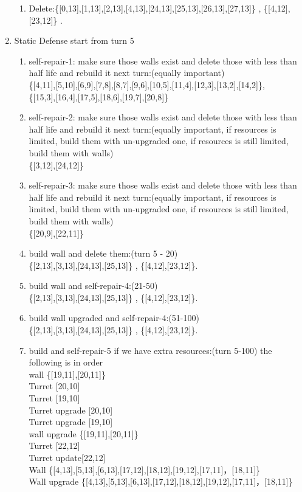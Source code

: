 \documentclass[12pt]{article}
\begin{document}
\begin{enumerate}
\begin{enumerate}
\item Delete:\{[0,13],[1,13],[2,13],[4,13],[24,13],[25,13],[26,13],[27,13]\} , \{[4,12],[23,12]\} .
\end{enumerate}
     \item Static Defense start from turn 5
\begin{enumerate}
\item self-repair-1: make sure those walls exist and delete those with less than half life and rebuild it next turn:(equally important)\\ \{[4,11],[5,10],[6,9],[7,8],[8,7],[9,6],[10,5],[11,4],[12,3],[13,2],[14,2]\},\\\{[15,3],[16,4],[17,5],[18,6],[19,7],[20,8]\}
\item self-repair-2: make sure those walls exist and delete those with less than half life and rebuild it next turn:(equally important, if resources is limited, build them with un-upgraded one, if resources is still limited, build them with walls)\\ \{[3,12],[24,12]\}
\item self-repair-3: make sure those walls exist and delete those with less than half life and rebuild it next turn:(equally important, if resources is limited, build them with un-upgraded one, if resources is still limited, build them with walls)\\ \{[20,9],[22,11]\}
\item build wall and delete them:(turn 5 - 20)\\ \{[2,13],[3,13],[24,13],[25,13]\} , \{[4,12],[23,12]\}.
\item build wall and self-repair-4:(21-50)\\ \{[2,13],[3,13],[24,13],[25,13]\} , \{[4,12],[23,12]\}.
\item build wall upgraded and self-repair-4:(51-100)\\ \{[2,13],[3,13],[24,13],[25,13]\} , \{[4,12],[23,12]\}.
\item build and self-repair-5 if we have extra resources:(turn 5-100) the following is in order\\ wall \{[19,11],[20,11]\}\\ Turret [20,10] \\ Turret [19,10] \\ Turret upgrade [20,10] \\ Turret upgrade [19,10] \\ wall upgrade \{[19,11],[20,11]\}\\ Turret [22,12]\\ Turret update[22,12]\\ Wall \{[4,13],[5,13],[6,13],[17,12],[18,12],[19,12],[17,11]，[18,11]\}\\ Wall upgrade \{[4,13],[5,13],[6,13],[17,12],[18,12],[19,12],[17,11]，[18,11]\}\

\end{enumerate}
\end{enumerate}
\end{document}
